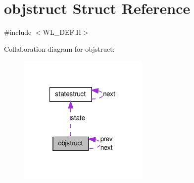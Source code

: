 \hypertarget{structobjstruct}{
\section{objstruct Struct Reference}
\label{structobjstruct}
}


{\ttfamily \#include $<$WL\_\-DEF.H$>$}



Collaboration diagram for objstruct:
\nopagebreak
\begin{figure}[H]
\begin{center}
\leavevmode
\includegraphics[width=179pt]{structobjstruct__coll__graph}
\end{center}
\end{figure}

